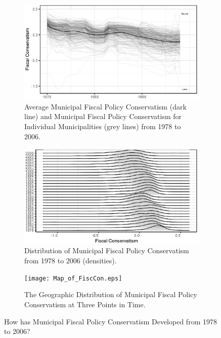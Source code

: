 \documentclass[a4paper,12pt]{article}
\begin{document}
\begin{figure}
	\centering 
	\begin{subfigure}[h]{0.38\textwidth} 
		\includegraphics[width=1\textwidth]{newtimes_lines.eps}
		\caption{Average Municipal Fiscal Policy Conservatism (dark line) and Municipal Fiscal Policy Conservatism for Individual Municipalities (grey lines) from 1978 to 2006.}
		\label{fig:timeline}
	\end{subfigure} \hspace{1cm}
	\begin{subfigure}{0.38\textwidth} 
		\includegraphics[width=1\textwidth]{newJoyPlotFiscal.eps}
		\caption{Distribution of Municipal Fiscal Policy Conservatism from 1978 to 2006 (densities).}
		\label{fig:lines}
	\end{subfigure}
	\begin{subfigure}{0.9\textwidth} 
		\texttt{[image: Map\_of\_FiscCon.eps]}
		\caption{The Geographic Distribution of Municipal Fiscal Policy Conservatism at Three Points in Time.}
		\label{fig:map}
	\end{subfigure} 
	
	\caption{How has Municipal Fiscal Policy Conservatism Developed from 1978 to 2006?}
	\label{fig:descriptive}
	
\end{figure}
\end{document}
